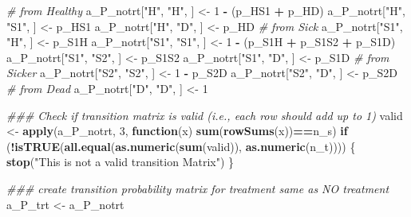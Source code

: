 \documentclass[
]{article}
\newenvironment{Shaded}{\begin{snugshade}}{\end{snugshade}}
\newcommand{\CommentTok}[1]{\textcolor[rgb]{0.56,0.35,0.01}{\textit{#1}}}
\newcommand{\ControlFlowTok}[1]{\textcolor[rgb]{0.13,0.29,0.53}{\textbf{#1}}}
\newcommand{\DecValTok}[1]{\textcolor[rgb]{0.00,0.00,0.81}{#1}}
\newcommand{\KeywordTok}[1]{\textcolor[rgb]{0.13,0.29,0.53}{\textbf{#1}}}
\newcommand{\NormalTok}[1]{#1}
\newcommand{\OperatorTok}[1]{\textcolor[rgb]{0.81,0.36,0.00}{\textbf{#1}}}
\newcommand{\StringTok}[1]{\textcolor[rgb]{0.31,0.60,0.02}{#1}}
\begin{document}
\begin{Shaded}
\begin{Highlighting}[]
\CommentTok{# from Healthy}
\NormalTok{a_P_notrt[}\StringTok{"H"}\NormalTok{, }\StringTok{"H"}\NormalTok{, ]   <-}\StringTok{ }\DecValTok{1} \OperatorTok{-}\StringTok{ }\NormalTok{(p_HS1 }\OperatorTok{+}\StringTok{ }\NormalTok{p_HD)}
\NormalTok{a_P_notrt[}\StringTok{"H"}\NormalTok{, }\StringTok{"S1"}\NormalTok{, ]  <-}\StringTok{ }\NormalTok{p_HS1}
\NormalTok{a_P_notrt[}\StringTok{"H"}\NormalTok{, }\StringTok{"D"}\NormalTok{, ]   <-}\StringTok{ }\NormalTok{p_HD}
\CommentTok{# from Sick}
\NormalTok{a_P_notrt[}\StringTok{"S1"}\NormalTok{, }\StringTok{"H"}\NormalTok{, ]  <-}\StringTok{ }\NormalTok{p_S1H}
\NormalTok{a_P_notrt[}\StringTok{"S1"}\NormalTok{, }\StringTok{"S1"}\NormalTok{, ] <-}\StringTok{ }\DecValTok{1} \OperatorTok{-}\StringTok{ }\NormalTok{(p_S1H }\OperatorTok{+}\StringTok{ }\NormalTok{p_S1S2 }\OperatorTok{+}\StringTok{ }\NormalTok{p_S1D)}
\NormalTok{a_P_notrt[}\StringTok{"S1"}\NormalTok{, }\StringTok{"S2"}\NormalTok{, ] <-}\StringTok{ }\NormalTok{p_S1S2}
\NormalTok{a_P_notrt[}\StringTok{"S1"}\NormalTok{, }\StringTok{"D"}\NormalTok{, ]  <-}\StringTok{ }\NormalTok{p_S1D}
\CommentTok{# from Sicker}
\NormalTok{a_P_notrt[}\StringTok{"S2"}\NormalTok{, }\StringTok{"S2"}\NormalTok{, ] <-}\StringTok{ }\DecValTok{1} \OperatorTok{-}\StringTok{ }\NormalTok{p_S2D}
\NormalTok{a_P_notrt[}\StringTok{"S2"}\NormalTok{, }\StringTok{"D"}\NormalTok{, ]  <-}\StringTok{ }\NormalTok{p_S2D}
\CommentTok{# from Dead}
\NormalTok{a_P_notrt[}\StringTok{"D"}\NormalTok{, }\StringTok{"D"}\NormalTok{, ]   <-}\StringTok{ }\DecValTok{1}

\CommentTok{### Check if transition matrix is valid (i.e., each row should add up to 1)}
\NormalTok{valid <-}\StringTok{ }\KeywordTok{apply}\NormalTok{(a_P_notrt, }\DecValTok{3}\NormalTok{, }\ControlFlowTok{function}\NormalTok{(x) }\KeywordTok{sum}\NormalTok{(}\KeywordTok{rowSums}\NormalTok{(x))}\OperatorTok{==}\NormalTok{n_s)}
\ControlFlowTok{if}\NormalTok{ (}\OperatorTok{!}\KeywordTok{isTRUE}\NormalTok{(}\KeywordTok{all.equal}\NormalTok{(}\KeywordTok{as.numeric}\NormalTok{(}\KeywordTok{sum}\NormalTok{(valid)), }\KeywordTok{as.numeric}\NormalTok{(n_t)))) \{}
  \KeywordTok{stop}\NormalTok{(}\StringTok{"This is not a valid transition Matrix"}\NormalTok{)}
\NormalTok{\}}

\CommentTok{### create transition probability matrix for treatment same as NO treatment}
\NormalTok{a_P_trt <-}\StringTok{ }\NormalTok{a_P_notrt}
\end{Highlighting}
\end{Shaded}
\end{document}
